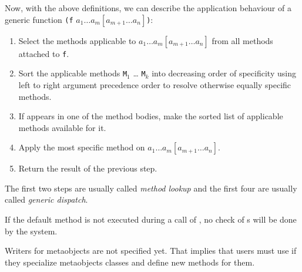 \begin{optDefinition}
Now, with the above definitions, we can describe the application
behaviour of a generic function {\tt (f} $a_1 \ldots a_m [a_{m+1} \ldots
a_n]${\tt )}:

\begin{enumerate}
        \item  Select the methods applicable to $a_1 \ldots a_m [a_{m+1} \ldots
        a_n]$ from all methods attached to {\tt f}.

        \item  Sort the applicable methods {\tt M$_{1}$} \ldots
            {\tt M$_{k}$} into
        decreasing order of specificity using left to right argument
        precedence order to resolve otherwise equally specific methods.

        \item  If  appears in one of the method
        bodies, make the sorted list of applicable methods available for it.

        \item  Apply the most specific method on $a_1 \ldots a_m [a_{m+1} \ldots
        a_n]$.

        \item  Return the result of the previous step.
\end{enumerate}

The first two steps are usually called {\em method lookup} and the
first four are usually called {\em generic dispatch}.
\end{optDefinition}

\begin{optPrivate}

\end{optPrivate}
\begin{optRationale}
    If the default method is not executed during a call of
    , no check of s will be done by the
    system.

    Writers for metaobjects are not specified yet. That implies that users must
    use  if they specialize metaobjects classes and
    define new  methods for them.
\end{optRationale}

